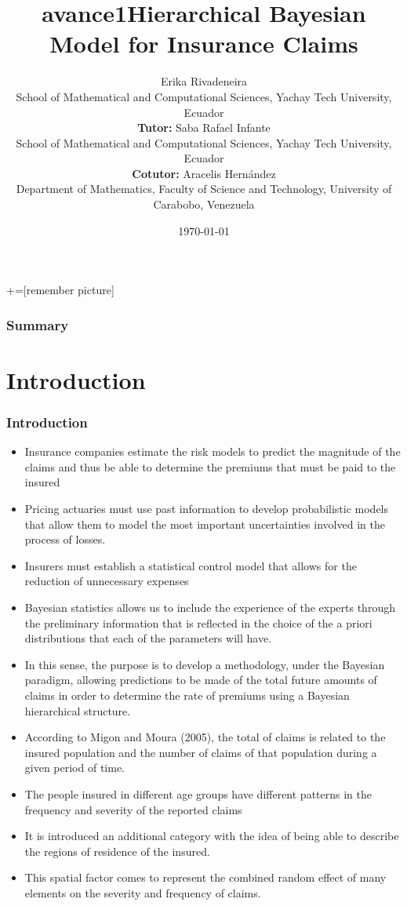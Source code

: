 \documentclass[10pt]{beamer} %
\title{avance1}
\title{Hierarchical Bayesian Model for Insurance Claims}
\author[]{Erika Rivadeneira\\ School of Mathematical and Computational Sciences, Yachay Tech University, Ecuador
\vspace{0.25cm}
\\{\small{\textbf{Tutor:} Saba Rafael Infante\\School of Mathematical and Computational Sciences, Yachay Tech University, Ecuador\\\textbf{Cotutor:} Aracelis Hernández\\Department of Mathematics, Faculty of Science and Technology, University of Carabobo, Venezuela}}}
\date{\today}
\begin{document}
+=[remember picture]
\lstset{}   
\everymath{\displaystyle}

\begin{frame}
	\titlepage
\end{frame}

\begin{frame}
\frametitle{Summary}
\tableofcontents
\end{frame}

\section{Introduction}

\begin{frame}
\frametitle[9pt]{Introduction}
\begin{itemize}
    \item Insurance companies estimate the risk models to predict the magnitude of the claims and thus be able to determine the premiums that must be paid to the insured

    \item Pricing actuaries must use past information to develop probabilistic models that allow them to model the most important uncertainties involved in the process of losses. 
    \item Insurers must establish a statistical control model that allows for the reduction of unnecessary expenses
    \item Bayesian statistics allows us to include the experience of the experts through the preliminary information that is reflected in the choice of the a priori distributions that each of the parameters will have.
    
\end{itemize}

\end{frame}
\begin{frame}
\begin{itemize}
    \item In this sense, the purpose is to develop a methodology, under the Bayesian paradigm, allowing predictions to be made of the total future amounts of claims in order to determine the rate of premiums using a Bayesian hierarchical structure.
    \item According to Migon and Moura (2005), the total of claims is related to the insured population and the number of claims of that population during a given period of time.
    \item The people insured in different age groups have different patterns in the frequency and severity of the reported claims
    \item It is introduced an additional category with the idea of being able to describe the regions of residence of the insured. 
    \item This spatial factor comes to represent the combined random effect of many elements on the severity and frequency of claims. 
\end{itemize}
\end{frame}
\end{document}
